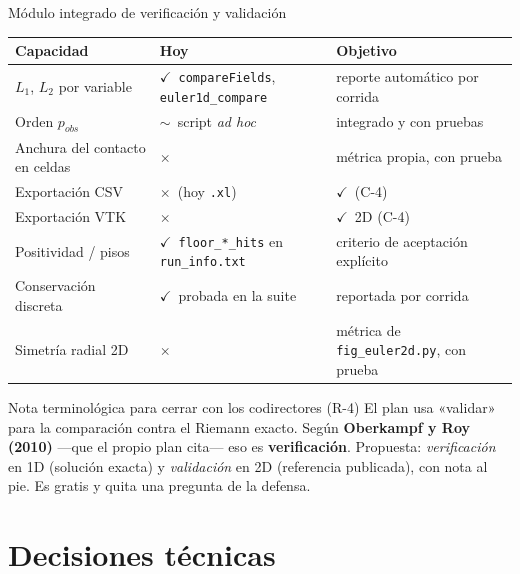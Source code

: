\documentclass[aspectratio=169,10pt]{beamer}
\newcommand{\si}{\textcolor{verde}{$\checkmark$}}
\newcommand{\no}{\textcolor{rojo}{$\times$}}
\newcommand{\parc}{\textcolor{naranja}{$\sim$}}
\newcommand{\cod}[1]{\texttt{\small #1}}
\begin{document}
\begin{frame}[shrink]{Módulo integrado de verificación y validación}
  \centering\scriptsize
  \begin{tabular}{@{}lll@{}}
    \toprule
    \textbf{Capacidad} & \textbf{Hoy} & \textbf{Objetivo} \\
    \midrule
    $L_1$, $L_2$ por variable          & \si\ \cod{compareFields}, \cod{euler1d\_compare} & reporte automático por corrida \\
    Orden $p_{obs}$                     & \parc\ script \emph{ad hoc} & integrado y con pruebas \\
    Anchura del contacto en celdas      & \no & métrica propia, con prueba \\
    Exportación CSV                     & \no\ (hoy \cod{.xl}) & \si\ (C-4) \\
    Exportación VTK                     & \no & \si\ 2D (C-4) \\
    Positividad / pisos                 & \si\ \cod{floor\_*\_hits} en \cod{run\_info.txt} & criterio de aceptación explícito \\
    Conservación discreta               & \si\ probada en la suite & reportada por corrida \\
    Simetría radial 2D                  & \no & métrica de \cod{fig\_euler2d.py}, con prueba \\
    \bottomrule
  \end{tabular}

  \vspace{0.7em}
  \begin{alertblock}{Nota terminológica para cerrar con los codirectores (R-4)}
    \small
    El plan usa «validar» para la comparación contra el Riemann exacto. Según
    \textbf{Oberkampf y Roy (2010)} —que el propio plan cita— eso es
    \textbf{verificación}. Propuesta: \emph{verificación} en 1D (solución exacta) y
    \emph{validación} en 2D (referencia publicada), con nota al pie. Es gratis y
    quita una pregunta de la defensa.
  \end{alertblock}
\end{frame}

\section{Decisiones técnicas}
\end{document}
